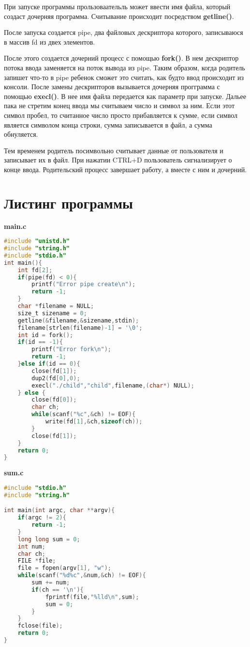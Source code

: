 \documentclass[pdf, unicode, 12pt, a4paper,oneside,fleqn]{article}
\begin{document}
При запуске программы прользоваательль может ввести имя файла, который создаст дочерняя программа.
Считывание происходит посредством \textbf{getline()}.

После запуска создается pipe, два файловых дескриптора которого, записываюся в массив fd из двех элементов.

После этого создается дочерний процесс с помощью \textbf{fork()}. В нем дескриптор потока ввода заменяется на поток вывода из pipe.
Таким образом, когда родитель запишет что-то в pipe ребенок сможет это считать, как будто ввод происходит из консоли. После замены 
дескрипторов вызывается дочерняя прогграмма с помощью \textbf{execl()}. В нее имя файла передается как параметр при запуске. 
Дальее пака не стретим конец ввода мы считываем число и символ за ним. Если этот символ пробел, то считанное число просто прибавляется к сумме, если 
символ является символом конца строки, сумма записывается в файл, а сумма обнуляется.

Тем временем родитель посимвольно считывает данные от пользователя и записывает их в файл.
При нажатии CTRL+D пользователь сигнализирует о конце ввода. Родительский процесс завершает работу,
а вместе с ним и дочерний.

\section{Листинг программы}

{\large\textbf{main.c}}

\begin{lstlisting}[language=C]
#include "unistd.h"
#include "string.h"
#include "stdio.h"
int main(){
    int fd[2];
    if(pipe(fd) < 0){
        printf("Error pipe create\n");
        return -1;
    }
    char *filename = NULL;
    size_t sizename = 0;
    getline(&filename,&sizename,stdin);
    filename[strlen(filename)-1] = '\0';
    int id = fork();
    if(id == -1){
        printf("Error fork\n");
        return -1;
    }else if(id == 0){
        close(fd[1]);
        dup2(fd[0],0);
        execl("./child","child",filename,(char*) NULL);
    } else {
        close(fd[0]);
        char ch;
        while(scanf("%c",&ch) != EOF){
            write(fd[1],&ch,sizeof(ch));  
        }
        close(fd[1]);
    }
    return 0;
}
\end{lstlisting}

{\large\textbf{sum.c}}

\begin{lstlisting}[language=C]
#include "stdio.h"
#include "string.h"

int main(int argc, char **argv){
    if(argc != 2){
        return -1;
    }
    long long sum = 0;
    int num;
    char ch;
    FILE *file;
    file = fopen(argv[1], "w");
    while(scanf("%d%c",&num,&ch) != EOF){
        sum += num;
        if(ch == '\n'){
            fprintf(file,"%lld\n",sum);
            sum = 0;
        }
    }
    fclose(file);
    return 0;
}
\end{lstlisting}
\end{document}
